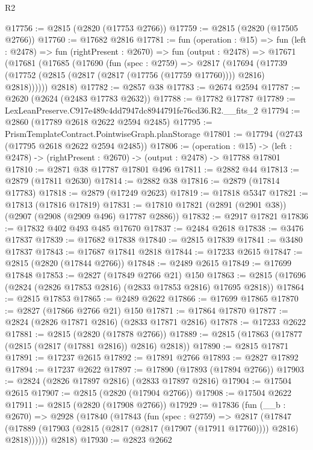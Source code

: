 \begin{lexlean}{R2}
\begin{coremodule}
@17756 := @2815 (@2820 (@17753 @2766))
@17759 := @2815 (@2820 (@17505 @2766))
@17760 := @17682 @2816
@17781 := fun (operation : @15) =>
  fun (left : @2478) =>
  fun (rightPresent : @2670) =>
  fun (output : @2478) =>
  @17671
    (@17681
      (@17685
        (@17690
          (fun (spec : @2759) =>
          @2817
            (@17694
              (@17739 (@17752 (@2815 (@2817 (@2817 (@17756 (@17759 @17760)))) @2816) @2818))))))
      @2818)
@17782 := @2857 @38
@17783 := @2674 @2594
@17787 := @2620 (@2624 (@2483 @17783 @2632))
@17788 := @17782 @17787
@17789 := LexLeanPreserve.C917e489c4dd7947dc8944791fe76cd36.R2.__fits_2
@17794 := @2860 (@17789 @2618 @2622 @2594 @2485)
@17795 := PrismTemplateContract.PointwiseGraph.planStorage
@17801 := @17794 (@2743 (@17795 @2618 @2622 @2594 @2485))
@17806 := (operation : @15) ->
  (left : @2478) -> (rightPresent : @2670) -> (output : @2478) -> @17788 @17801
@17810 := @2871 @38 @17787 @17801 @496
@17811 := @2882 @44
@17813 := @2879 (@17811 @2630)
@17814 := @2882 @38
@17816 := @2879 (@17814 @17783)
@17818 := @2879 (@17249 @2623)
@17819 := @17818 @5347
@17821 := @17813 (@17816 @17819)
@17831 := @17810 @17821 (@2891 (@2901 @38)) (@2907 (@2908 (@2909 @496) @17787 @2886))
@17832 := @2917 @17821
@17836 := @17832 @402 @493 @485 @17670
@17837 := @2484 @2618
@17838 := @3476 @17837
@17839 := @17682 @17838
@17840 := @2815 @17839
@17841 := @3480 @17837
@17843 := @17687 @17841 @2818
@17844 := @17233 @2615
@17847 := @2815 (@2820 (@17844 @2766))
@17848 := @2489 @2615
@17849 := @17699 @17848
@17853 := @2827 (@17849 @2766 @21) @150
@17863 := @2815 (@17696 (@2824 (@2826 @17853 @2816) (@2833 @17853 @2816) @17695 @2818))
@17864 := @2815 @17853
@17865 := @2489 @2622
@17866 := @17699 @17865
@17870 := @2827 (@17866 @2766 @21) @150
@17871 := @17864 @17870
@17877 := @2824 (@2826 @17871 @2816) (@2833 @17871 @2816)
@17878 := @17233 @2622
@17881 := @2815 (@2820 (@17878 @2766))
@17889 := @2815 (@17863 (@17877 (@2815 (@2817 (@17881 @2816)) @2816) @2818))
@17890 := @2815 @17871
@17891 := @17237 @2615
@17892 := @17891 @2766
@17893 := @2827 @17892
@17894 := @17237 @2622
@17897 := @17890 (@17893 (@17894 @2766))
@17903 := @2824 (@2826 @17897 @2816) (@2833 @17897 @2816)
@17904 := @17504 @2615
@17907 := @2815 (@2820 (@17904 @2766))
@17908 := @17504 @2622
@17911 := @2815 (@2820 (@17908 @2766))
@17929 := @17836
    (fun (__b : @2670) =>
    @2928
      (@17840
        (@17843
          (fun (spec : @2759) =>
          @2817
            (@17847
              (@17889 (@17903 (@2815 (@2817 (@2817 (@17907 (@17911 @17760)))) @2816) @2818))))))
      @2818)
@17930 := @2823 @2662

\end{coremodule}
\end{lexlean}
